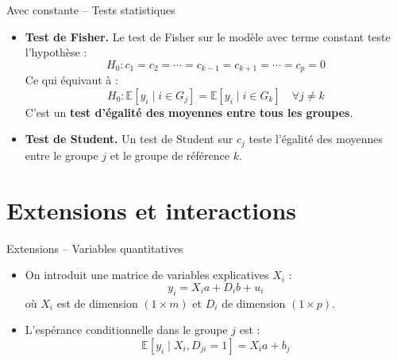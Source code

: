 \documentclass[11pt,aspectratio=169]{beamer}
\newcommand{\E}{\mathbb{E}}
\begin{document}
\begin{frame}{Avec constante -- Tests statistiques}

\begin{itemize}

\item \textbf{Test de Fisher.} Le test de Fisher sur le modèle avec terme constant teste l'hypothèse :
  \[
  H_0 : c_1 = c_2 = \cdots = c_{k-1} = c_{k+1} = \cdots = c_p = 0
  \]
  Ce qui équivaut à :
  \[
  H_0 : \E[y_i \mid i \in G_j] = \E[y_i \mid i \in G_k] \quad \forall j \neq k
  \]
  C'est un \textbf{test d'égalité des moyennes entre tous les groupes}.\newline

\item \textbf{Test de Student.} Un test de Student sur $c_j$ teste l'égalité des moyennes entre le groupe $j$ et le groupe de référence $k$.

\end{itemize}

\end{frame}

\section{Extensions et interactions}

\begin{frame}{Extensions -- Variables quantitatives}

\begin{itemize}

\item On introduit une matrice de variables explicatives $X_i$ :
  \[
  y_i = X_i a + D_i b + u_i
  \]
  où $X_i$ est de dimension $(1 \times m)$ et $D_i$ de dimension $(1 \times p)$.\newline

\item L'espérance conditionnelle dans le groupe $j$ est :
  \[
  \E[y_i \mid X_i, D_{ji} = 1] = X_i a + b_j
  \]

\end{itemize}

\end{frame}
\end{document}
